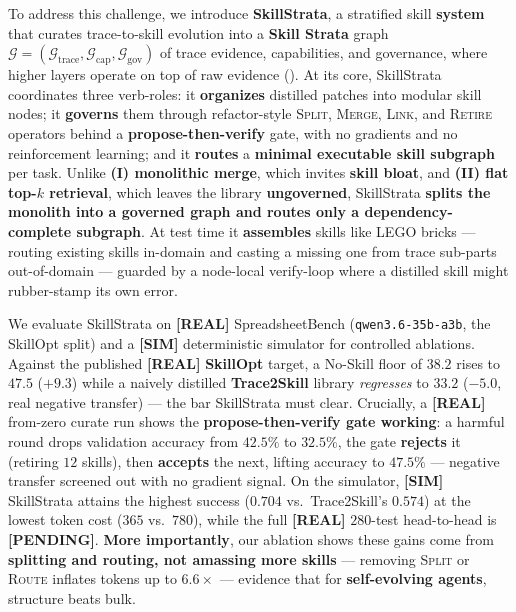 To address this challenge, we introduce \textbf{SkillStrata}, a stratified skill \textbf{system} that curates trace-to-skill evolution into a \textbf{Skill Strata} graph $\mathcal{G}=(\mathcal{G}_{\text{trace}},\mathcal{G}_{\text{cap}},\mathcal{G}_{\text{gov}})$ of trace evidence, capabilities, and governance, where higher layers operate on top of raw evidence ().
At its core, SkillStrata coordinates three verb-roles: it \textbf{organizes} distilled patches into modular skill nodes; it \textbf{governs} them through refactor-style \textsc{Split}, \textsc{Merge}, \textsc{Link}, and \textsc{Retire} operators behind a \textbf{propose-then-verify} gate, with no gradients and no reinforcement learning; and it \textbf{routes} a \textbf{minimal executable skill subgraph} per task.
Unlike \textbf{(I) monolithic merge}, which invites \textbf{skill bloat}, and \textbf{(II) flat top-$k$ retrieval}, which leaves the library \textbf{ungoverned}, SkillStrata \textbf{splits the monolith into a governed graph and routes only a dependency-complete subgraph}.
At test time it \textbf{assembles} skills like LEGO bricks --- routing existing skills in-domain and casting a missing one from trace sub-parts out-of-domain --- guarded by a node-local verify-loop where a distilled skill might rubber-stamp its own error.

We evaluate SkillStrata on \textbf{[REAL]} SpreadsheetBench (\texttt{qwen3.6-35b-a3b}, the SkillOpt split) and a \textbf{[SIM]} deterministic simulator for controlled ablations.
Against the published \textbf{[REAL]} \textbf{SkillOpt} target, a No-Skill floor of $38.2$ rises to $47.5$ ($+9.3$) while a naively distilled \textbf{Trace2Skill} library \emph{regresses} to $33.2$ ($-5.0$, real negative transfer) --- the bar SkillStrata must clear.
Crucially, a \textbf{[REAL]} from-zero curate run shows the \textbf{propose-then-verify gate working}: a harmful round drops validation accuracy from $42.5\%$ to $32.5\%$, the gate \textbf{rejects} it (retiring $12$ skills), then \textbf{accepts} the next, lifting accuracy to $47.5\%$ --- negative transfer screened out with no gradient signal.
On the simulator, \textbf{[SIM]} SkillStrata attains the highest success ($0.704$ vs.\ Trace2Skill's $0.574$) at the lowest token cost ($365$ vs.\ $780$), while the full \textbf{[REAL]} $280$-test head-to-head is \textbf{[PENDING]}.
\textbf{More importantly}, our ablation shows these gains come from \textbf{splitting and routing, not amassing more skills} --- removing \textsc{Split} or \textsc{Route} inflates tokens up to $6.6\times$ --- evidence that for \textbf{self-evolving agents}, structure beats bulk.

